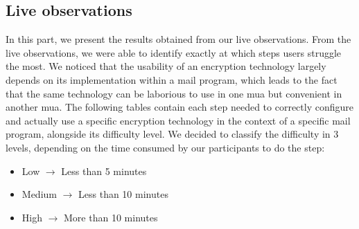 \subsection{Live observations}
In this part, we present the results obtained from our live observations. From the live observations, we were able to identify exactly at which steps users struggle the most. We noticed that the usability of an encryption technology largely depends on its implementation within a mail program, which leads to the fact that the same technology can be laborious to use in one \acrshort{mua} but convenient in another \acrshort{mua}. The following tables contain each step needed to correctly configure and actually use a specific encryption technology in the context of a specific mail program, alongside its difficulty level. We decided to classify the difficulty in 3 levels, depending on the time consumed by our participants to do the step:
\begin{itemize}
	\item Low $\rightarrow$ Less than 5 minutes
	\item Medium $\rightarrow$ Less than 10 minutes
	\item High $\rightarrow$ More than 10 minutes
\end{itemize}